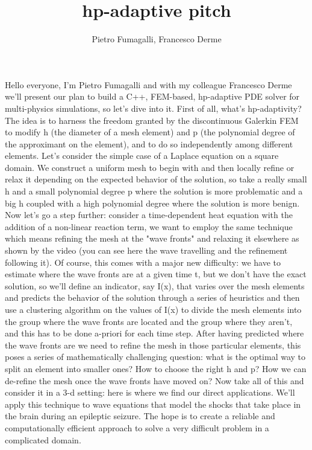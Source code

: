 \documentclass{article}
\title{hp-adaptive pitch}
\author{Pietro Fumagalli, Francesco Derme}
\begin{document}
\maketitle
\noindent
Hello everyone, I'm Pietro Fumagalli and with my colleague Francesco Derme we'll present our plan to build a C++, FEM-based, hp-adaptive PDE solver for multi-physics simulations, so let's dive into it. First of all, what's hp-adaptivity? The idea is to harness the freedom granted by the discontinuous Galerkin FEM to modify h (the diameter of a mesh element) and p (the polynomial degree of the approximant on the element), and to do so independently among different elements.
\newline
\newline
Let's consider the simple case of a Laplace equation on a square domain. We construct a uniform mesh to begin with and then locally refine or relax it depending on the expected behavior of the solution, so take a really small h and a small polynomial degree p where the solution is more problematic and a big h coupled with a high polynomial degree where the solution is more benign.
\newline
\newline
Now let's go a step further: consider a time-dependent heat equation with the addition of a non-linear reaction term, we want to employ the same technique which means refining the mesh at the "wave fronts" and relaxing it elsewhere as shown by the video (you can see here the wave travelling and the refinement following it). Of course, this comes with a major new difficulty: we have to estimate where the wave fronts are at a given time t, but we don't have the exact solution, so we'll define an indicator, say I(x), that varies over the mesh elements and predicts the behavior of the solution through a series of heuristics and then use a clustering algorithm on the values of I(x) to divide the mesh elements into the group where the wave fronts are located and the group where they aren't, and this has to be done a-priori for each time step. After having predicted where the wave fronts are we need to refine the mesh in those particular elements, this poses a series of mathematically challenging question: what is the optimal way to split an element into smaller ones? How to choose the right h and p? How we can de-refine the mesh once the wave fronts have moved on?
\newline
\newline
Now take all of this and consider it in a 3-d setting: here is where we find our direct applications. We'll apply this technique to wave equations that model the shocks that take place in the brain during an epileptic seizure. The hope is to create a reliable and computationally efficient approach to solve a very difficult problem in a complicated domain. 
\end{document}

